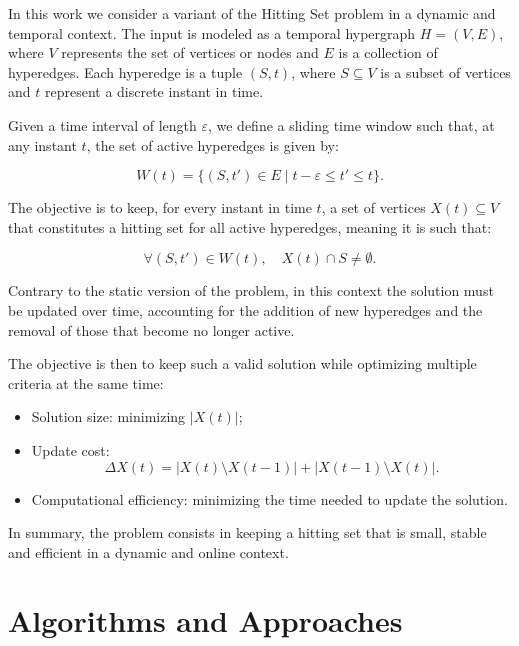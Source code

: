 \documentclass[11pt]{article}
\begin{document}
In this work we consider a variant of the Hitting Set problem in a dynamic and temporal context. The input is modeled as a temporal hypergraph $H=(V,E)$, where $V$ represents the set of vertices or nodes and $E$ is a collection of hyperedges. Each hyperedge is a tuple $(S,t)$, where $S \subseteq V$ is a subset of vertices and $t$ represent a discrete instant in time.

Given a time interval of length $\varepsilon$, we define a sliding time window such that, at any instant $t$, the set of active hyperedges is given by:

\begin{equation}
W(t)=\{(S,t') \in E \mid t-\varepsilon \leq t' \leq t\}.
\end{equation}

The objective is to keep, for every instant in time $t$, a set of vertices $X(t) \subseteq V$ that constitutes a hitting set for all active hyperedges, meaning it is such that:

\begin{equation}
\forall (S,t') \in W(t), \quad X(t) \cap S \neq \emptyset.
\end{equation}

Contrary to the static version of the problem, in this context the solution must be updated over time, accounting for the addition of new hyperedges and the removal of those that become no longer active.

The objective is then to keep such a valid solution while optimizing multiple criteria at the same time:

\begin{itemize}
\item Solution size: minimizing $|X(t)|$;
\item Update cost:
\begin{equation}
\Delta X(t) = |X(t) \setminus X(t-1)| + |X(t-1) \setminus X(t)|.
\end{equation}
\item Computational efficiency: minimizing the time needed to update the solution.
\end{itemize}

In summary, the problem consists in keeping a hitting set that is small, stable and efficient in a dynamic and online context.

\section{Algorithms and Approaches}
\end{document}

